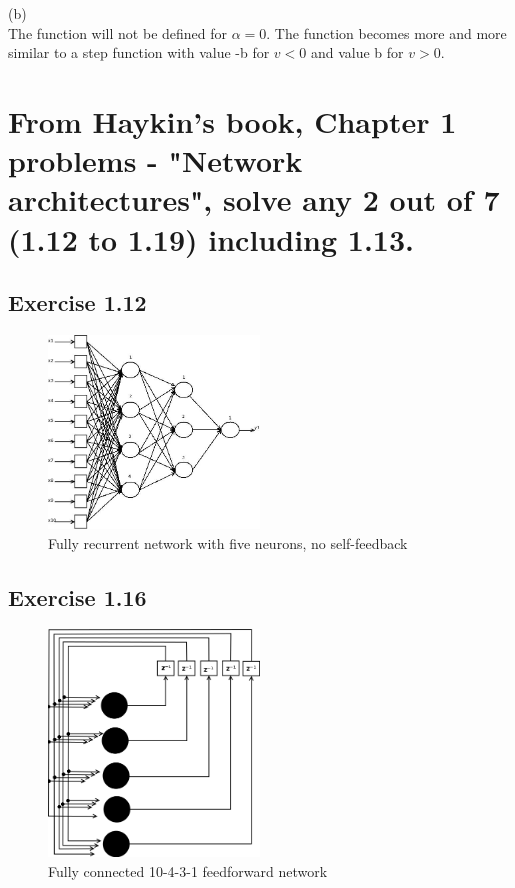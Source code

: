 \documentclass[paper=a4, fontsize=11pt]{scrartcl} %
\numberwithin{equation}{section} %
\numberwithin{figure}{section} %
\numberwithin{table}{section} %
\begin{document}
(b)\\
The function will not be defined for $\alpha =0$. The function becomes more and more similar to a step function with value -b for $v<0$ and value b for $v>0$.

\section{From Haykin's book, Chapter 1 problems - "Network architectures", solve any 2 out of 7
(1.12 to 1.19) including 1.13.}

\subsection{Exercise 1.12}
\begin{figure}[ht]
	\centering
  \includegraphics[width=0.5\textwidth]{1_12.jpeg}
	\caption{Fully recurrent network with five neurons, no self-feedback}
	\label{fig1}
\end{figure}


\subsection{Exercise 1.16}
\begin{figure}[ht]
	\centering
  \includegraphics[width=0.5\textwidth]{1_16.png}
	\caption{Fully connected 10-4-3-1 feedforward network }
	\label{fig1}
\end{figure}
\end{document}
